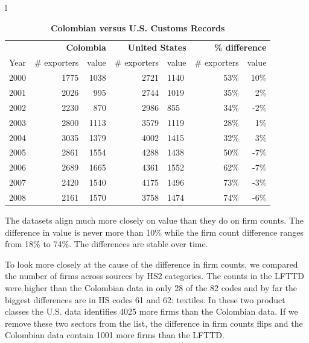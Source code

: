 \documentclass[12pt,titlepage]{article}
\begin{document}
\begin{table}
    \centering
{\small 
\begin{tabular}{l}
\begin{tabular}{rrrrlrr} \hline \hline 

& \multicolumn{2}{r}{\textbf{Colombia}} & \multicolumn{2}{r}{\textbf{United
States}} & \multicolumn{2}{r}{\textbf{\% difference}} \\ \cline{2-7}
Year & \# exporters & value & \# exporters & value & \# exporters & value \\ 
\hline
2000 & 1775 & 1038 & 2721 & 1140 & 53\% & 10\% \\ 
2001 & 2026 & 995 & 2744 & 1019 & 35\% & 2\% \\ 
2002 & 2230 & 870 & 2986 & 855 & 34\% & -2\% \\ 
2003 & 2800 & 1113 & 3579 & 1119 & 28\% & 1\% \\ 
2004 & 3035 & 1379 & 4002 & 1415 & 32\% & 3\% \\ 
2005 & 2861 & 1554 & 4288 & 1438 & 50\% & -7\% \\ 
2006 & 2689 & 1665 & 4361 & 1552 & 62\% & -7\% \\ 
2007 & 2420 & 1540 & 4175 & 1496 & 73\% & -3\% \\ 
2008 & 2161 & 1570 & 3758 & 1474 & 74\% & -6\% \\ \hline
\end{tabular}%
\end{tabular}%
}
\caption{\textbf{Colombian versus U.S. Customs Records}}
\label{tab:ap_dat_comp}
\end{table}

The datasets align much more closely on value than they do on firm counts.
The difference in value is never more than 10\% while the firm count
difference ranges from 18\% to 74\%. The differences are stable over time.

To look more closely at the cause of the difference in firm counts, we
compared the number of firms across sources by HS2 categories. The counts in
the LFTTD were higher than the Colombian data in only 28 of the 82 codes and
by far the biggest differences are in HS codes 61 and 62: textiles. In these
two product classes the U.S. data identifies 4025 more firms than the
Colombian data. If we remove these two sectors from the list, the difference
in firm counts flips and the Colombian data contain 1001 more firms than the
LFTTD.
\end{document}
